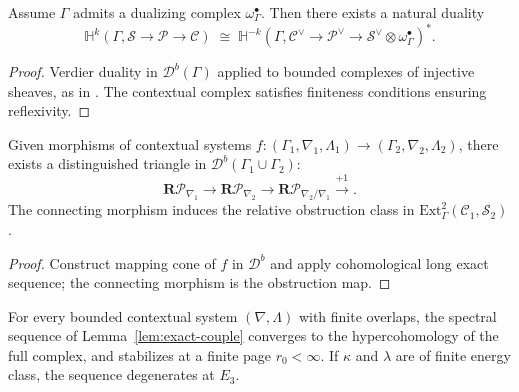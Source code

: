 \begin{theorem}\label{thm:verdier}
Assume $\Gamma$ admits a dualizing complex $\omega_\Gamma^\bullet$. Then there exists a natural duality
\[
\mathbb H^k(\Gamma,\mathcal S\!\to\!\mathcal P\!\to\!\mathcal C)
\;\cong\;
\mathbb H^{-k}(\Gamma,\mathcal C^\vee\!\to\!\mathcal P^\vee\!\to\!\mathcal S^\vee\otimes\omega_\Gamma^\bullet)^{*}.
\]
\end{theorem}

\begin{proof}
Verdier duality in $\mathcal D^b(\Gamma)$ applied to bounded complexes of injective sheaves, as in \cite{Verdier1967,KashiwaraSchapira1990}. The contextual complex satisfies finiteness conditions ensuring reflexivity. \relax
\end{proof}


\begin{lemma}\label{lem:triangle}
Given morphisms of contextual systems $f:(\Gamma_1,\nabla_1,\Lambda_1)\to(\Gamma_2,\nabla_2,\Lambda_2)$, there exists a distinguished triangle in $\mathcal D^b(\Gamma_1\cup\Gamma_2)$:
\[
\mathbf R\mathcal P_{\nabla_1}\longrightarrow
\mathbf R\mathcal P_{\nabla_2}\longrightarrow
\mathbf R\mathcal P_{\nabla_2/\nabla_1}\xrightarrow{+1}.
\]
The connecting morphism induces the relative obstruction class in $\mathrm{Ext}^2_\Gamma(\mathcal C_1,\mathcal S_2)$.
\end{lemma}

\begin{proof}
Construct mapping cone of $f$ in $\mathcal D^b$ and apply cohomological long exact sequence; the connecting morphism is the obstruction map. \relax
\end{proof}


\begin{theorem}\label{thm:convergence}
For every bounded contextual system $(\nabla,\Lambda)$ with finite overlaps, the spectral sequence of Lemma~\ref{lem:exact-couple} converges to the hypercohomology of the full complex, and stabilizes at a finite page $r_0<\infty$. 
If $\kappa$ and $\lambda$ are of finite energy class, the sequence degenerates at $E_3$.
\end{theorem}


